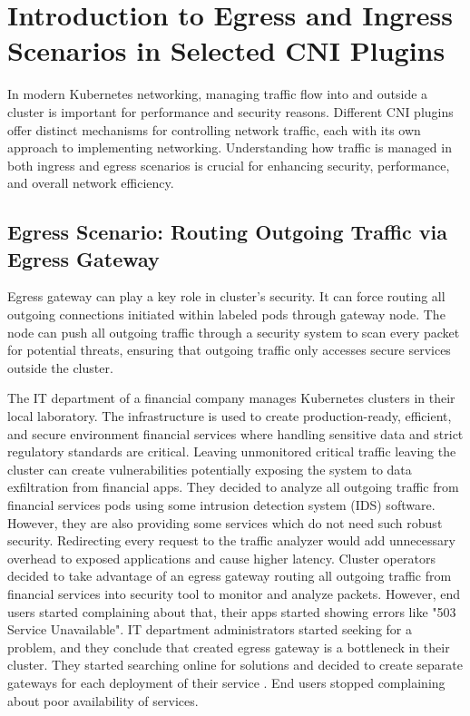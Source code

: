 \chapter{Introduction to Egress and Ingress Scenarios in Selected CNI Plugins}
\label{cha:introScenarios}
In modern Kubernetes networking, managing traffic flow into and outside a cluster is important for performance and security reasons. Different CNI plugins offer distinct mechanisms for controlling network traffic, each with its own approach to implementing networking. Understanding how traffic is managed in both ingress and egress scenarios is crucial for enhancing security, performance, and overall network efficiency.

\section{Egress Scenario: Routing Outgoing Traffic via Egress Gateway}
\label{sec:egress}

Egress gateway can play a key role in cluster's security. It can force routing all outgoing connections initiated within labeled pods through gateway node. The node can push all outgoing traffic through a security system to scan every packet for potential threats, ensuring that outgoing traffic only accesses secure services outside the cluster.

The IT department of a financial company manages Kubernetes clusters in their local laboratory. The infrastructure is used to create production-ready, efficient, and secure environment financial services where handling sensitive data and strict regulatory standards are critical. Leaving unmonitored critical traffic leaving the cluster can create vulnerabilities potentially exposing the system to data exfiltration from financial apps. They decided to analyze all outgoing traffic from financial services pods using some intrusion detection system (IDS) software. However, they are also providing some services which do not need such robust security. Redirecting every request to the traffic analyzer would add unnecessary overhead to exposed applications and cause higher latency. Cluster operators decided to take advantage of an egress gateway routing all outgoing traffic from financial services into security tool to monitor and analyze packets. However, end users started complaining about that, their apps started showing errors like "503 Service Unavailable". IT department  administrators started seeking for a problem, and they conclude that created egress gateway is a bottleneck in their cluster. They started searching online for solutions and decided to create separate gateways for each deployment of their service \cite{CalicoEgressDeploy}. End users stopped complaining about poor availability of services.


